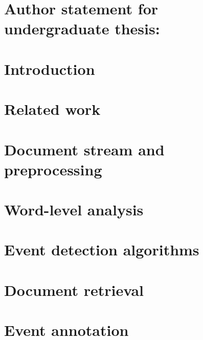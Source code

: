 \documentclass[12pt,twoside]{report}
\begin{document}





\chapter*{Author statement for undergraduate thesis:}



\newpage



\tableofcontents

\chapter{Introduction}
\label{chap:introduction}


\chapter{Related work}
\label{chap:related-work}


\chapter{Document stream and preprocessing}
\label{chap:data-preprocessing}


\chapter{Word-level analysis}
\label{chap:word-analysis}


\chapter{Event detection algorithms}
\label{chap:event-detection}


\chapter{Document retrieval}
\label{chap:document-retrieval}


\chapter{Event annotation}
\label{chap:event-annotation}

\end{document}
